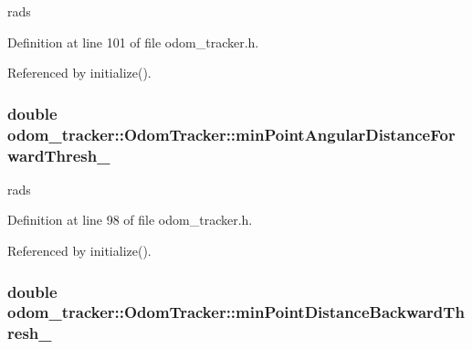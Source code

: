 rads 



Definition at line 101 of file odom\+\_\+tracker.\+h.



Referenced by initialize().

\subsubsection[{\texorpdfstring{min\+Point\+Angular\+Distance\+Forward\+Thresh\+\_\+}{minPointAngularDistanceForwardThresh_}}]{\setlength{\rightskip}{0pt plus 5cm}double odom\+\_\+tracker\+::\+Odom\+Tracker\+::min\+Point\+Angular\+Distance\+Forward\+Thresh\+\_\+\hspace{0.3cm}{\ttfamily [protected]}}\hypertarget{classodom__tracker_1_1OdomTracker_acd2883047a61afe3f574af0995ef7a09}{}\label{classodom__tracker_1_1OdomTracker_acd2883047a61afe3f574af0995ef7a09}


rads 



Definition at line 98 of file odom\+\_\+tracker.\+h.



Referenced by initialize().

\subsubsection[{\texorpdfstring{min\+Point\+Distance\+Backward\+Thresh\+\_\+}{minPointDistanceBackwardThresh_}}]{\setlength{\rightskip}{0pt plus 5cm}double odom\+\_\+tracker\+::\+Odom\+Tracker\+::min\+Point\+Distance\+Backward\+Thresh\+\_\+\hspace{0.3cm}{\ttfamily [protected]}}\hypertarget{classodom__tracker_1_1OdomTracker_ae168f975b648874e7f00c2431683b3b1}{}\label{classodom__tracker_1_1OdomTracker_ae168f975b648874e7f00c2431683b3b1}


